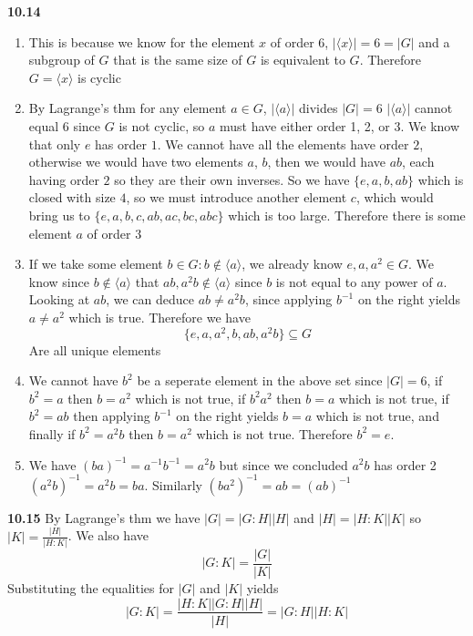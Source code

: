 \documentclass[12pt]{article}
\newenvironment{ques}{\vspace{2 ex}}{\vspace{2 ex}}
\theoremstyle{definition}
\begin{document}
\begin{ques}
	\textbf{10.14}
		\begin{enumerate}
			\item
				This is because we know for the element $x$ of order $6$,
				$|\langle x \rangle| = 6 = |G|$ and a subgroup
				of $G$ that is the same size of $G$ is
				equivalent to $G$. Therefore $G = \langle x
				\rangle$ is cyclic
			\item
				By Lagrange's thm for any element $a \in G$,
				$|\langle a \rangle|$ divides $|G| = 6$
				$|\langle a \rangle|$ cannot equal $6$ since
				$G$ is not cyclic, so $a$ must have either
				order 1, 2, or 3. We know that only $e$ has
				order $1$. We cannot have all the elements have
				order $2$, otherwise we would have two elements
				$a$, $b$, then we would have $ab$, each having
				order $2$ so they are their own inverses. So we
				have $\{e, a, b, ab\}$ which is closed with size $4$,
				so we must introduce another element $c$, which
				would bring us to $\{e, a, b, c, ab, ac, bc,
				abc\}$ which is too large. Therefore there is
				some element $a$ of order $3$
			\item
				If we take some element $b \in G: b \notin
				\langle a \rangle$, we already know $e, a, a^2
				\in G$. We know since $b \notin
				\langle a \rangle$ that $ab, a^2b \notin
				\langle a \rangle$ since $b$ is not equal to any
				power of $a$. Looking at $ab$, we can deduce
				$ab \neq a^2b$, since applying $b^{-1}$ on the
				right yields $a \neq a^2$ which is true. Therefore we have
				$$\{e, a, a^2, b, ab, a^2b\} \subseteq G$$
				Are all unique elements
			\item 
				We cannot have $b^2$ be a seperate element in
				the above set since $|G| = 6$, if $b^2 = a$
				then $b = a^2$ which is not true, if $b^2 a^2$
				then $b = a$ which is not true, if $b^2 = ab$
				then applying $b^{-1}$ on the right yields $b =
				a$ which is not true, and finally if $b^2 =
				a^2b$ then $b = a^2$ which is not true.
				Therefore $b^2 = e$.
			\item
				We have $(ba)^{-1} = a^{-1}b^{-1} = a^2b$ but
				since we concluded $a^2b$ has order 2
				$(a^2b)^{-1} = a^2b = ba$. Similarly
				$(ba^2)^{-1} = ab = (ab)^{-1}$
		\end{enumerate}
\end{ques}

\begin{ques}
	\textbf{10.15}
		By Lagrange's thm we have $|G| = |G:H||H|$ and $|H| = |H:K||K|$
		so $|K| = \frac{|H|}{|H:K|}$. We also have
		$$|G:K|= \frac{|G|}{|K|}$$
		Substituting the equalities for $|G|$ and $|K|$ yields
		$$|G:K| = \frac{|H:K||G:H||H|}{|H|} = |G:H||H:K|$$
\end{ques}
\end{document}
